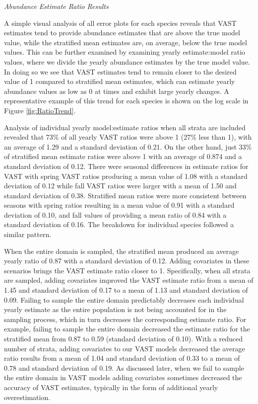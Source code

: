 \documentclass[
  12pt,
]{article}
\begin{document}
\emph{Abundance Estimate Ratio Results}

A simple visual analysis of all error plots for each species reveals that VAST estimates tend to provide abundance estimates that are above the true model value, while the stratified mean estimates are, on average, below the true model values. This can be further examined by examining yearly estimate:model ratio values, where we divide the yearly abundance estimates by the true model value. In doing so we see that VAST estimates tend to remain closer to the desired value of 1 compared to stratified mean estimates, which can estimate yearly abundance values as low as 0 at times and exhibit large yearly changes. A representative example of this trend for each species is shown on the log scale in Figure \ref{fig:RatioTrend}.

Analysis of individual yearly model:estimate ratios when all strata are included revealed that 73\% of all yearly VAST ratios were above 1 (27\% less than 1), with an average of 1.29 and a standard deviation of 0.21. On the other hand, just 33\% of stratified mean estimate ratios were above 1 with an average of 0.874 and a standard deviation of 0.12. There were seasonal differences in estimate ratios for VAST with spring VAST ratios producing a mean value of 1.08 with a standard deviation of 0.12 while fall VAST ratios were larger with a mean of 1.50 and standard deviation of 0.38. Stratified mean ratios were more consistent between seasons with spring ratios resulting in a mean value of 0.91 with a standard deviation of 0.10, and fall values of providing a mean ratio of 0.84 with a standard deviation of 0.16. The breakdown for individual species followed a similar pattern.

When the entire domain is sampled, the stratified mean produced an average yearly ratio of 0.87 with a standard deviation of 0.12. Adding covariates in these scenarios brings the VAST estimate ratio closer to 1. Specifically, when all strata are sampled, adding covariates improved the VAST estimate ratio from a mean of 1.45 and standard deviation of 0.17 to a mean of 1.13 and standard deviation of 0.09. Failing to sample the entire domain predictably decreases each individual yearly estimate as the entire population is not being accounted for in the sampling process, which in turn decreases the corresponding estimate ratio. For example, failing to sample the entire domain decreased the estimate ratio for the stratified mean from 0.87 to 0.59 (standard deviation of 0.10). With a reduced number of strata, adding covariates to our VAST models decreased the average ratio results from a mean of 1.04 and standard deviation of 0.33 to a mean of 0.78 and standard deviation of 0.19. As discussed later, when we fail to sample the entire domain in VAST models adding covariates sometimes decreased the accuracy of VAST estimates, typically in the form of additional yearly overestimation.
\end{document}
